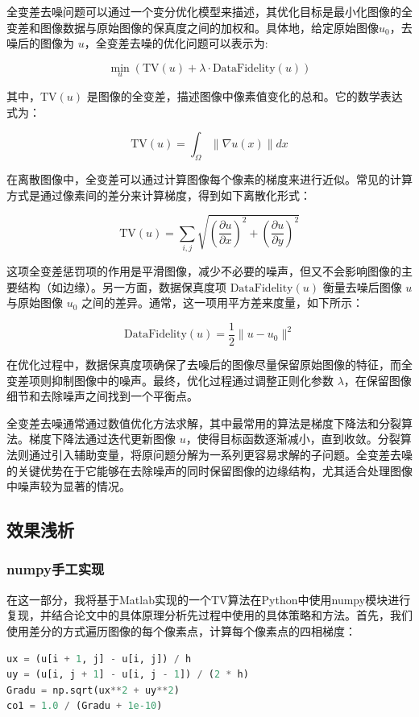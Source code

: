 \documentclass[UTF8]{ctexart}
\begin{document}
全变差去噪问题可以通过一个变分优化模型来描述，其优化目标是最小化图像的全变差和图像数据与原始图像的保真度之间的加权和。具体地，给定原始图像$u_0$，去噪后的图像为 $u$，全变差去噪的优化问题可以表示为:

\[
\min_u \left( \text{TV}(u) + \lambda \cdot \text{DataFidelity}(u) \right)
\]

其中，\( \text{TV}(u) \) 是图像的全变差，描述图像中像素值变化的总和。它的数学表达式为：

\[
\text{TV}(u) = \int_{\Omega} \|\nabla u(x)\|dx
\]

在离散图像中，全变差可以通过计算图像每个像素的梯度来进行近似。常见的计算方式是通过像素间的差分来计算梯度，得到如下离散化形式：

\[
\text{TV}(u) = \sum_{i,j} \sqrt{\left( \frac{\partial u}{\partial x} \right)^2 + \left( \frac{\partial u}{\partial y} \right)^2}
\]

这项全变差惩罚项的作用是平滑图像，减少不必要的噪声，但又不会影响图像的主要结构（如边缘）。另一方面，数据保真度项 \( \text{DataFidelity}(u) \) 衡量去噪后图像 \( u \) 与原始图像 \( u_0 \) 之间的差异。通常，这一项用平方差来度量，如下所示：

\[
\text{DataFidelity}(u) = \frac{1}{2} \| u - u_0 \|^2
\]

在优化过程中，数据保真度项确保了去噪后的图像尽量保留原始图像的特征，而全变差项则抑制图像中的噪声。最终，优化过程通过调整正则化参数 \( \lambda \)，在保留图像细节和去除噪声之间找到一个平衡点。

全变差去噪通常通过数值优化方法求解，其中最常用的算法是梯度下降法和分裂算法。梯度下降法通过迭代更新图像 \( u \)，使得目标函数逐渐减小，直到收敛。分裂算法则通过引入辅助变量，将原问题分解为一系列更容易求解的子问题。全变差去噪的关键优势在于它能够在去除噪声的同时保留图像的边缘结构，尤其适合处理图像中噪声较为显著的情况。
\subsection{效果浅析}
\subsubsection{numpy手工实现}
在这一部分，我将基于Matlab实现的一个TV算法在Python中使用numpy模块进行复现，并结合论文中的具体原理分析先过程中使用的具体策略和方法。首先，我们使用差分的方式遍历图像的每个像素点，计算每个像素点的四相梯度：
\begin{lstlisting}[language=Python, caption={梯度计算}, label={lst:code1}, mathescape=true, breaklines=true]
ux = (u[i + 1, j] - u[i, j]) / h
uy = (u[i, j + 1] - u[i, j - 1]) / (2 * h)
Gradu = np.sqrt(ux**2 + uy**2)
co1 = 1.0 / (Gradu + 1e-10)
  \end{lstlisting}
\end{document}
